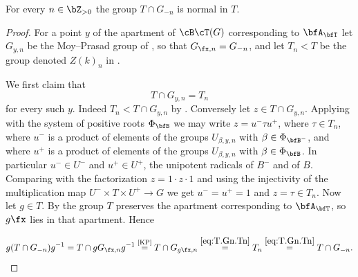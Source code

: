 \documentclass[12pt,a4paper]{amsart}%
\newcommand{\claude}[1]{{{#1}}}
\newcommand{\RamiE}[1]{{{#1}}}
\newcommand{\RamiF}[1]{{{#1}}}
\begin{document}
\begin{lemma}\label{lem:T.norm}
\claude{For every $n\in\Z_{>0}$ the group $T\cap G_{-n}$ is normal in $T$.}
\end{lemma}
\begin{proof}
\claude{For a point $y$ of the apartment of $\cB\cT(G)$ corresponding to $\bfA_\bfT$ let $G_{y,n}$ be the Moy--Prasad group of \cite[Definition 13.2.1]{KP}, so that $G_{\fx,n}=G_{-n}$, and let $T_n<T$ be the group denoted $Z(k)_n$ in \cite[Proposition 13.2.5(3)]{KP}.}

\claude{We first claim that 
\begin{equation}\label{eq:T.Gn.Tn}
 T\cap G_{y,n}=T_n   
\end{equation}
for every such $y$. Indeed $T_n<T\cap G_{y,n}$ by \cite[Proposition 13.2.5(3)]{KP}. Conversely let $z\in T\cap G_{y,n}$. Applying \cite[Proposition 13.2.5(3)]{KP} with the system of positive roots $\Phi_\bfB$ we may write $z=u^-\tau u^+$, where $\tau\in T_n$, where $u^-$ is a product of elements of the groups $U_{\beta,y,n}$ with $\beta\in\Phi_{\bfB^-}$, and where $u^+$ is a product of elements of the groups $U_{\beta,y,n}$ with $\beta\in\Phi_\bfB$. In particular $u^-\in U^-$ and $u^+\in U^+$, the unipotent radicals of $B^-$ and of $B$. Comparing with the factorization $z=1\cdot z\cdot 1$ and using the injectivity of the multiplication map $U^-\times T\times U^+\to G$ we get $u^-=u^+=1$ and $z=\tau\in T_n$.}
\RamiE{
Now let $g\in T$. By \cite[Axiom 4.1.4(A\,1), \S4.3]{KP} the group $T$ preserves the apartment corresponding to $\bfA_\bfT$, so $g\fx$ lies in that apartment. Hence}
\RamiF{
$$g(T\cap G_{-n})g^{-1}=T\cap gG_{\fx,n}g^{-1}\overset{\text{\cite[Prop. 13.2.5(2)]{KP}}}{=}T\cap G_{g\fx,n}\overset{\eqref{eq:T.Gn.Tn}}{=}T_n\overset{\eqref{eq:T.Gn.Tn}}{=}T\cap G_{-n}.$$

}

\end{proof}
\end{document}
